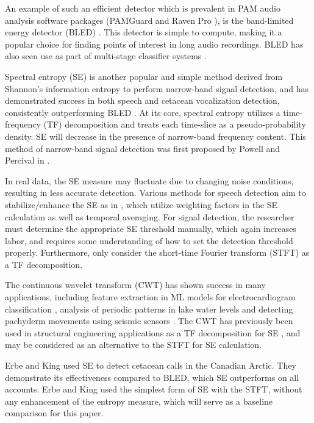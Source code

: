 An example of such an efficient detector which is prevalent in PAM audio analysis 
software packages (PAMGuard \citep{PAMGuard} and Raven Pro \citep{raven}), %
is the band-limited energy detector (BLED) \citep{internalsignaldetection}. 
This detector is simple to compute, making it a popular choice for finding 
points of interest in long audio recordings. BLED has also seen use as part of multi-stage classifier systems \citep{unsupervised}.

Spectral entropy (SE) is another popular and simple method derived from Shannon's 
information entropy \citep{shannon} to perform narrow-band signal detection, and has 
demonstrated success in both speech and cetacean vocalization detection, consistently 
outperforming BLED \citep{entropyJASA, entropyOCEANS, entropysubband}.  At its core, 
spectral entropy utilizes a time-frequency (TF) decomposition and treats each time-slice as a pseudo-probability density. 
SE will decrease in the presence of narrow-band frequency content. This method of narrow-band signal detection was first 
proposed by Powell and Percival in \citep{entropyorig}. 

In real data, the SE measure may fluctuate due to changing noise conditions, resulting in less accurate detection. Various methods for speech detection aim to stabilize/enhance the SE as in \citep{entropyOCEANS, entropysubband}, which utilize weighting factors in the SE calculation 
as well as temporal averaging. For signal detection, the researcher must 
determine the appropriate SE threshold manually, which again increases 
labor, and requires some understanding of how to set the detection threshold properly. Furthermore, \citep{entropyOCEANS, entropysubband} only consider the short-time Fourier transform (STFT) as a TF decomposition. 

The continuous wavelet transform (CWT) has shown success in many applications, 
including feature extraction in ML models for electrocardiogram classification \citep{ecgcwt}, 
analysis of periodic patterns in lake water levels \citep{lakelevelcwt} and detecting pachyderm 
movements using seismic sensors \citep{seismiccwt}. The CWT has previously been used in structural 
engineering applications as a TF decomposition for SE \citep{cwtentropy1, cwtentropy2}, and may be 
considered as an alternative to the STFT for SE calculation.

Erbe and King \citep{entropyJASA} used SE to detect  cetacean calls in the Canadian Arctic. They demonstrate its effectiveness compared to BLED, which SE outperforms on all accounts. Erbe and King used the simplest form of SE with the STFT, without any enhancement of the entropy measure, which will serve as a baseline comparison for this paper. 


